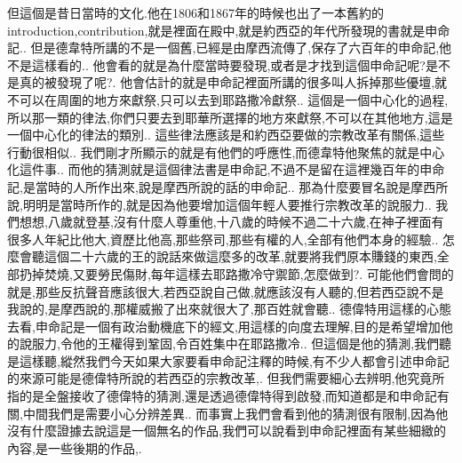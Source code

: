 \documentclass{book}
\begin{document}
但這個是昔日當時的文化.他在1806和1867年的時候也出了一本舊約的introduction,contribution,就是裡面在殿中,就是約西亞的年代所發現的書就是申命記..
但是德韋特所講的不是一個舊,已經是由摩西流傳了,保存了六百年的申命記,他不是這樣看的..
他會看的就是為什麼當時要發現,或者是才找到這個申命記呢?是不是真的被發現了呢?.
他會估計的就是申命記裡面所講的很多叫人拆掉那些優壇,就不可以在周圍的地方來獻祭,只可以去到耶路撒冷獻祭..
這個是一個中心化的過程,所以那一類的律法,你們只要去到耶華所選擇的地方來獻祭,不可以在其他地方,這是一個中心化的律法的類別..
這些律法應該是和約西亞要做的宗教改革有關係,這些行動很相似..
我們剛才所顯示的就是有他們的呼應性,而德韋特他聚焦的就是中心化這件事..
而他的猜測就是這個律法書是申命記,不過不是留在這裡幾百年的申命記,是當時的人所作出來,說是摩西所說的話的申命記..
那為什麼要冒名說是摩西所說,明明是當時所作的,就是因為他要增加這個年輕人要推行宗教改革的說服力..
我們想想,八歲就登基,沒有什麼人尊重他,十八歲的時候不過二十六歲,在神子裡面有很多人年紀比他大,資歷比他高,那些祭司,那些有權的人,全部有他們本身的經驗..
怎麼會聽這個二十六歲的王的說話來做這麼多的改革,就要將我們原本賺錢的東西,全部扔掉焚燒,又要勞民傷財,每年這樣去耶路撒冷守禦節,怎麼做到?.
可能他們會問的就是,那些反抗聲音應該很大,若西亞說自己做,就應該沒有人聽的,但若西亞說不是我說的,是摩西說的,那權威搬了出來就很大了,那百姓就會聽..
德偉特用這樣的心態去看,申命記是一個有政治動機底下的經文,用這樣的向度去理解,目的是希望增加他的說服力,令他的王權得到鞏固,令百姓集中在耶路撒冷..
但這個是他的猜測,我們聽是這樣聽,縱然我們今天如果大家要看申命記注釋的時候,有不少人都會引述申命記的來源可能是德偉特所說的若西亞的宗教改革,.
但我們需要細心去辨明,他究竟所指的是全盤接收了德偉特的猜測,還是透過德偉特得到啟發,而知道都是和申命記有關,中間我們是需要小心分辨差異..
而事實上我們會看到他的猜測很有限制,因為他沒有什麼證據去說這是一個無名的作品,我們可以說看到申命記裡面有某些細緻的內容,是一些後期的作品,.
\end{document}
